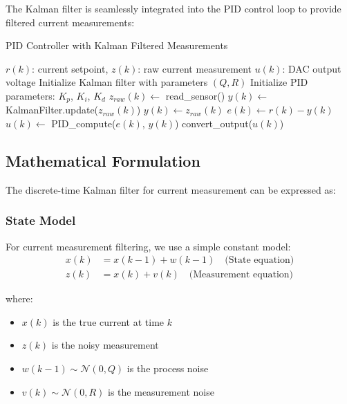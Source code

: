 \documentclass{article}
\begin{document}
The Kalman filter is seamlessly integrated into the PID control loop to provide filtered current measurements:

\begin{algorithm}
\caption{PID Controller with Kalman Filtered Measurements}
\label{alg:pid_with_kalman}
\begin{algorithmic}[1]
\REQUIRE $r(k)$: current setpoint, $z(k)$: raw current measurement
\ENSURE $u(k)$: DAC output voltage
\STATE Initialize Kalman filter with parameters $(Q, R)$
\STATE Initialize PID parameters: $K_p$, $K_i$, $K_d$
    \STATE $z_{raw}(k) \leftarrow$ read\_sensor() 
        \STATE $y(k) \leftarrow$ KalmanFilter.update($z_{raw}(k)$) 
    \ELSE
        \STATE $y(k) \leftarrow z_{raw}(k)$ 
    \ENDIF
    \STATE $e(k) \leftarrow r(k) - y(k)$ 
    \STATE $u(k) \leftarrow$ PID\_compute($e(k)$, $y(k)$) 
    \STATE convert\_output($u(k)$) 
\ENDWHILE
\end{algorithmic}
\end{algorithm}

\subsection{Mathematical Formulation}

The discrete-time Kalman filter for current measurement can be expressed as:

\subsubsection{State Model}
For current measurement filtering, we use a simple constant model:
\begin{align}
x(k) &= x(k-1) + w(k-1) \quad \text{(State equation)} \\
z(k) &= x(k) + v(k) \quad \text{(Measurement equation)}
\end{align}

where:
\begin{itemize}
    \item $x(k)$ is the true current at time $k$
    \item $z(k)$ is the noisy measurement
    \item $w(k-1) \sim \mathcal{N}(0, Q)$ is the process noise
    \item $v(k) \sim \mathcal{N}(0, R)$ is the measurement noise
\end{itemize}
\end{document}
